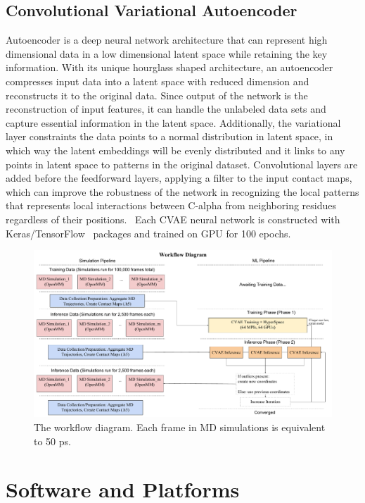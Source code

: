 \documentclass[conference,final]{IEEEtran}
\begin{document}
\subsection{Convolutional Variational Autoencoder}

Autoencoder is a deep neural network architecture that can represent high
dimensional data in a low dimensional latent space while retaining the key
information. With its unique hourglass shaped architecture, an autoencoder
compresses input data into a latent space with reduced dimension and
reconstructs it to the original data. Since output of the network is the
reconstruction of input features, it can handle the unlabeled data sets and
capture essential information in the latent space. Additionally, the
variational layer constraints the data points to a normal distribution in
latent space, in which way the latent embeddings will be evenly distributed
and it links to any points in latent space to patterns in the original
dataset. Convolutional layers are added before the feedforward layers,
applying a filter to the input contact maps, which can improve the robustness
of the network in recognizing the local patterns that represents local
interactions between C-alpha from neighboring residues regardless of their
positions.~\cite{bhowmik2018deep}  Each CVAE neural network is constructed with Keras/TensorFlow~\cite{chollet2015keras,abadi2016tensorflow}
packages and trained on GPU for 100 epochs.


\begin{figure}
	\centering
	\includegraphics[width=.8\textwidth]{MicroScope_Workflow_Diagram}
	\caption{The workflow diagram. Each frame in MD simulations is equivalent to 50 ps. }
	\label{fig:microscopeworkflowdiagram}
\end{figure}
\section{Software and Platforms}
\end{document}
